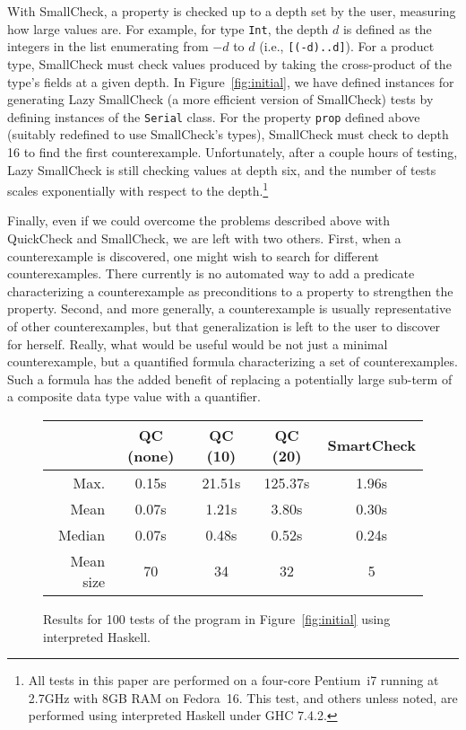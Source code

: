 \documentclass[9pt]{sigplanconf}
\newcommand{\ttp}[1]{\texttt{#1}}
\begin{document}
With SmallCheck, a property is checked up to a depth set by the user, measuring
how large values are.  For example, for type \ttp{Int}, the depth $d$ is defined
as the integers in the list enumerating from $-d$ to $d$ (i.e.,
\ttp{[(-d)..d]}).  For a product type, SmallCheck must check values produced by
taking the cross-product of the type's fields at a given depth.  In
Figure~\ref{fig:initial}, we have defined instances for generating Lazy
SmallCheck (a more efficient version of SmallCheck) tests by defining instances
of the \ttp{Serial} class.  For the property \ttp{prop} defined above (suitably
redefined to use SmallCheck's types), SmallCheck must check to depth 16 to find
the first counterexample.  Unfortunately, after a couple hours of testing, Lazy
SmallCheck is still checking values at depth six, and the number of tests scales
exponentially with respect to the depth.\footnote{All tests in this paper are
  performed on a four-core Pentium~i7 running at 2.7GHz with 8GB RAM on
  Fedora~16.  This test, and others unless noted, are performed using
  interpreted Haskell under GHC 7.4.2.}

Finally, even if we could overcome the problems described above with QuickCheck
and SmallCheck, we are left with two others.  First, when a
counterexample is discovered, one might wish to search for different
counterexamples.  There currently is no automated way to add a predicate
characterizing a counterexample as preconditions to a property to strengthen the
property.  Second, and more generally, a counterexample is usually
representative of other counterexamples, but that generalization is left to the
user to discover for herself.  Really, what would be useful would be not just a
minimal counterexample, but a quantified formula characterizing a set of
counterexamples.  Such a formula has the added benefit of replacing a
potentially large sub-term of a composite data type value with a quantifier.


\begin{figure}[ht]
\scriptsize
  \begin{center}
    \begin{tabular}{|r||c|c|c|c|}
\hline 
 & QC (none) & QC (10) & QC (20) & SmartCheck \\      
\hline \hline 
Max.  & 0.15s & 21.51s & 125.37s & 1.96s\\
\hline
Mean  & 0.07s & 1.21s & 3.80s & 0.30s\\
\hline
Median & 0.07s & 0.48s & 0.52s & 0.24s\\
\hline
Mean size & 70 & 34 & 32 & 5\\
\hline
    \end{tabular}
  \end{center}
  \caption{Results for 100 tests of the program in Figure~\ref{fig:initial}
    using interpreted Haskell.}
  \label{fig:results}
\end{figure}
\end{document}
